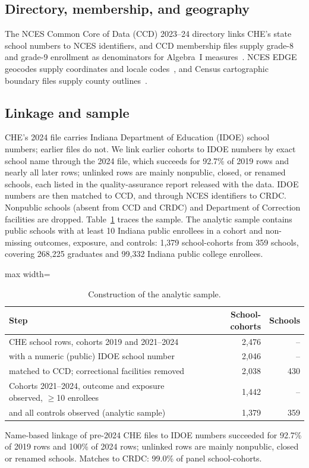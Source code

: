 \documentclass[aps,prd,reprint,superscriptaddress,nofootinbib,floatfix]{revtex4-2}
\begin{document}
\subsection{Directory, membership, and geography}

The NCES Common Core of Data (CCD) 2023--24 directory links CHE's state school numbers to NCES identifiers, and CCD membership files supply grade-8 and grade-9 enrollment as denominators for Algebra~I measures~\cite{ccd}. NCES EDGE geocodes supply coordinates and locale codes~\cite{edge}, and Census cartographic boundary files supply county outlines~\cite{census}.

\subsection{Linkage and sample}

CHE's 2024 file carries Indiana Department of Education (IDOE) school numbers; earlier files do not. We link earlier cohorts to IDOE numbers by exact school name through the 2024 file, which succeeds for 92.7\% of 2019 rows and nearly all later rows; unlinked rows are mainly nonpublic, closed, or renamed schools, each listed in the quality-assurance report released with the data. IDOE numbers are then matched to CCD, and through NCES identifiers to CRDC. Nonpublic schools (absent from CCD and CRDC) and Department of Correction facilities are dropped. Table~\ref{tab:sample} traces the sample. The analytic sample contains public schools with at least 10 Indiana public enrollees in a cohort and non-missing outcomes, exposure, and controls: 1,379 school-cohorts from 359 schools, covering 268,225 graduates and 99,332 Indiana public college enrollees.

\begin{table}[t]
\caption{Construction of the analytic sample.}
\label{tab:sample}
\footnotesize
\begin{adjustbox}{max width=\linewidth}
\begin{tabular}{lrr}
\hline\hline
Step & School-cohorts & Schools \\
\hline
CHE school rows, cohorts 2019 and 2021--2024 & 2,476 & -- \\
\quad with a numeric (public) IDOE school number & 2,046 & -- \\
\quad matched to CCD; correctional facilities removed & 2,038 & 430 \\
Cohorts 2021--2024, outcome and exposure observed, $\geq$10 enrollees & 1,442 & -- \\
\quad and all controls observed (analytic sample) & 1,379 & 359 \\
\hline\hline
\end{tabular}
\end{adjustbox}
\par\smallskip\parbox{0.98\linewidth}{\scriptsize Name-based linkage of pre-2024 CHE files to IDOE numbers succeeded for 92.7\% of 2019 rows and 100\% of 2024 rows; unlinked rows are mainly nonpublic, closed or renamed schools. Matches to CRDC: 99.0\% of panel school-cohorts.}
\end{table}
\end{document}
